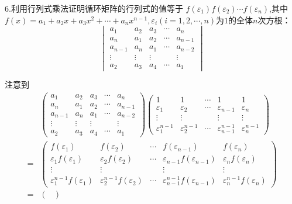 6.利用行列式乘法证明循环矩阵的行列式的值等于
$f\left(\varepsilon_1\right)f\left(\varepsilon_2\right)\cdots f\left(\varepsilon_n\right)$,其中
$f\left(x\right)=a_1+a_2x+a_3x^2+
\cdots+a_nx^{n-1},\varepsilon_i\left(i=1,2,\cdots,n\right)$为$1$的全体$n$次方根：
\[
\begin{vmatrix}
	a_1&a_2&a_3&\cdots&a_n\\
    a_n&a_1&a_2&\cdots&a_{n-1}\\
    a_{n-1}&a_n&a_1&\cdots&a_{n-2}\\
    \vdots&\vdots&\vdots&&\vdots\\
    a_2&a_3&a_4&\cdots&a_{1}
\end{vmatrix}
\]
\begin{Proof}
注意到\begin{align*}
	&\begin{pmatrix}
	a_1&a_2&a_3&\cdots&a_n\\
    a_n&a_1&a_2&\cdots&a_{n-1}\\
    a_{n-1}&a_n&a_1&\cdots&a_{n-2}\\
    \vdots&\vdots&\vdots&&\vdots\\
    a_2&a_3&a_4&\cdots&a_{1}
\end{pmatrix}\begin{pmatrix}
	1&1&\cdots&1&1\\
	\varepsilon_1&\varepsilon_2&\cdots&\varepsilon_{n-1}&\varepsilon_n\\
	\vdots&\vdots&&\vdots&\vdots\\
	\varepsilon_1^{n-1}&\varepsilon_2^{n-1}&\cdots&\varepsilon_{n-1}^{n-1}&\varepsilon_n^{n-1}
\end{pmatrix}\\
=&\begin{pmatrix}
	f\left(\varepsilon_1\right)&f\left(\varepsilon_2\right)&\cdots&f\left(\varepsilon_{n-1}\right)&f\left(\varepsilon_n\right)\\
	\varepsilon_1 f\left(\varepsilon_1\right)&\varepsilon_2 f\left(\varepsilon_2\right)&\cdots&\varepsilon_{n-1} f\left(\varepsilon_{n-1}\right)&\varepsilon_n f\left(\varepsilon_n\right)\\
	\vdots&\vdots&&\vdots&\vdots\\
	\varepsilon_1^{n-1} f\left(\varepsilon_1\right)&\varepsilon_2^{n-1} f\left(\varepsilon_2\right)&\cdots&\varepsilon_{n-1}^{n-1} f\left(\varepsilon_{n-1}\right)&\varepsilon_n ^{n-1} f\left(\varepsilon_n\right)
\end{pmatrix}\\
=&\begin{pmatrix}

\end{pmatrix}
\end{align*}
\end{Proof}
